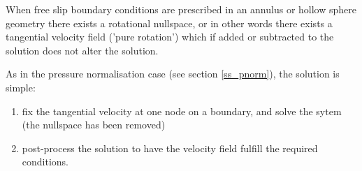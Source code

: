 
When free slip boundary conditions are prescribed in an annulus or
hollow sphere geometry there exists a rotational nullspace, or in other words there exists
a tangential velocity field ('pure rotation') which if added or subtracted to the solution 
does not alter the solution. 

As in the pressure normalisation case (see section \ref{ss_pnorm}), the solution is simple:
\begin{enumerate}
\item fix the tangential velocity at one node on a boundary, and solve the sytem (the nullspace 
has been removed)
\item post-process the solution to have the velocity field fulfill the required conditions. 
\end{enumerate}


